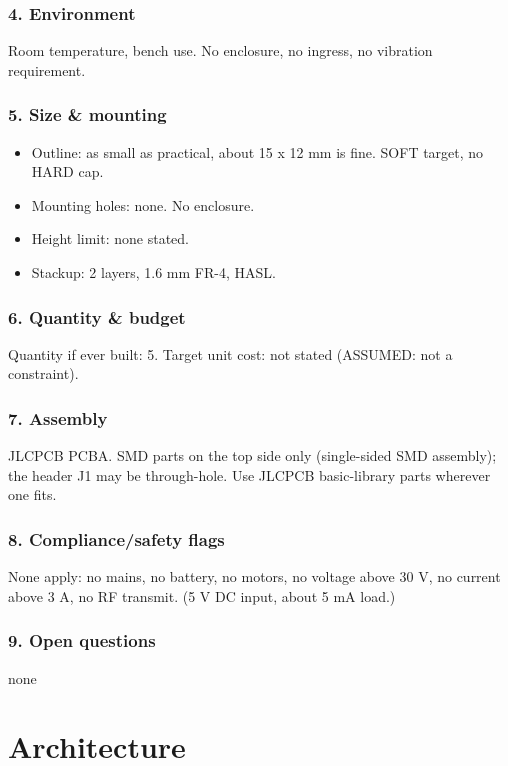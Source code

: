 \documentclass[11pt]{article}
\begin{document}
\subsubsection*{4. Environment}
Room temperature, bench use. No enclosure, no ingress, no vibration requirement.

\subsubsection*{5. Size \& mounting}
\begin{itemize}
\item Outline: as small as practical, about 15 x 12 mm is fine. SOFT target, no HARD cap.
\item Mounting holes: none. No enclosure.
\item Height limit: none stated.
\item Stackup: 2 layers, 1.6 mm FR-4, HASL.
\end{itemize}
\subsubsection*{6. Quantity \& budget}
Quantity if ever built: 5. Target unit cost: not stated (ASSUMED: not a constraint).

\subsubsection*{7. Assembly}
JLCPCB PCBA. SMD parts on the top side only (single-sided SMD assembly); the header J1 may be through-hole. Use JLCPCB basic-library parts wherever one fits.

\subsubsection*{8. Compliance/safety flags}
None apply: no mains, no battery, no motors, no voltage above 30 V, no current above 3 A, no RF transmit. (5 V DC input, about 5 mA load.)

\subsubsection*{9. Open questions}
none

\section{Architecture}
\end{document}
